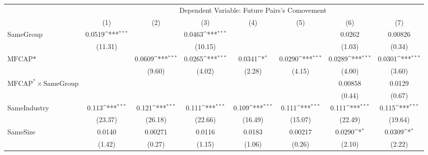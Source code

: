 {
\def\sym#1{\ifmmode^{#1}\else\(^{#1}\)\fi}
\begin{tabular}{l*{7}{c}}
\hline\hline
                &\multicolumn{7}{c}{Dependent Variable:  Future Pairs's Comovement}                                                                  \\\cmidrule(lr){2-8}
                &\multicolumn{1}{c}{(1)}         &\multicolumn{1}{c}{(2)}         &\multicolumn{1}{c}{(3)}         &\multicolumn{1}{c}{(4)}         &\multicolumn{1}{c}{(5)}         &\multicolumn{1}{c}{(6)}         &\multicolumn{1}{c}{(7)}         \\
\hline
SameGroup       &   0.0519\sym{***}&                  &   0.0463\sym{***}&                  &                  &   0.0262         &  0.00826         \\
                &  (11.31)         &                  &  (10.15)         &                  &                  &   (1.03)         &   (0.34)         \\
[1em]
$ \text{MFCAP*} $&                  &   0.0609\sym{***}&   0.0265\sym{***}&   0.0341\sym{*}  &   0.0290\sym{***}&   0.0289\sym{***}&   0.0301\sym{***}\\
                &                  &   (9.60)         &   (4.02)         &   (2.28)         &   (4.15)         &   (4.00)         &   (3.60)         \\
[1em]
 $ \text{MFCAP}^* \times {\text{SameGroup} }  $ &                  &                  &                  &                  &                  &  0.00858         &   0.0129         \\
                &                  &                  &                  &                  &                  &   (0.44)         &   (0.67)         \\
[1em]
SameIndustry    &    0.113\sym{***}&    0.121\sym{***}&    0.111\sym{***}&    0.109\sym{***}&    0.111\sym{***}&    0.111\sym{***}&    0.115\sym{***}\\
                &  (23.37)         &  (26.18)         &  (22.66)         &  (16.49)         &  (15.07)         &  (22.49)         &  (19.64)         \\
[1em]
SameSize        &   0.0140         &  0.00271         &   0.0116         &   0.0183         &  0.00217         &   0.0290\sym{*}  &   0.0309\sym{*}  \\
                &   (1.42)         &   (0.27)         &   (1.15)         &   (1.06)         &   (0.26)         &   (2.10)         &   (2.22)         \\

\end{tabular}}
